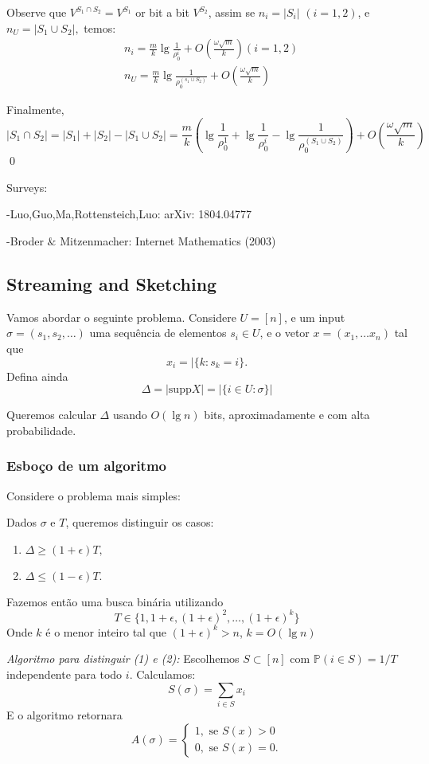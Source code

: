 Observe que $V^{S_1\cap S_2} = V^{S_1} $ or bit a bit $V^{S_2}$, assim se $n_i=|S_i|$  $(i=1,2)$, e $n_U = |S_1\cup S_2|,$ temos:
\begin{align*}
&n_i = \frac{m}{k} \lg \frac{1}{\rho_0^i} + O\left(\frac{\omega \sqrt m}{k}\right) 	(i=1,2)\\
&n_U = \frac{m}{k} \lg \frac{1}{\rho_0^{(s_1 \cup S_2)}} + O\left(\frac{\omega \sqrt m}{k}\right)
\end{align*}

Finalmente,
\[|S_1 \cap S_2| = |S_1| + |S_2| - |S_1\cup S_2| = \frac{m}{k}\left( \lg \frac{1}{\rho_0^1} + \lg \frac{1}{\rho_0^i} - \lg \frac{1}{\rho_0^{(S_1\cup S_2)}} \right)+ O\left(\frac{\omega \sqrt m}{k}\right) \]
\qed

Surveys:

-Luo,Guo,Ma,Rottensteich,Luo: arXiv: 1804.04777

-Broder $\&$ Mitzenmacher: Internet Mathematics (2003)

\subsection{Streaming and Sketching} Vamos abordar o seguinte problema. Considere $U=[n]$, e um input $\sigma = (s_1,s_2,\dots)$ uma sequ\^encia de elementos $s_i \in U$, e o vetor $x=(x_1,\dots x_n)$ tal que
\[x_i=|\{k:s_k=i\}.\]
Defina ainda 
\[\Delta = |\text{supp} X| = |\{i \in U: \sigma \}|\] 

Queremos calcular $\Delta$ usando $O(\lg n)$ bits, aproximadamente e com alta probabilidade.

\subsubsection{Esbo\c{c}o de um algoritmo}
Considere o problema mais simples:

Dados $\sigma$ e $T$, queremos distinguir os casos:

\begin{enumerate}
\item $\Delta \ge (1+\epsilon)T,$
\item $\Delta \le (1-\epsilon)T.$
\end{enumerate}

Fazemos ent\~ao uma busca bin\'aria utilizando 
\[T \in \{1, 1+\epsilon, (1+\epsilon)^2, \dots, (1+\epsilon)^k\}\]
Onde $k$ \'e o menor inteiro tal que $(1+\epsilon)^k>n$, $k=O(\lg n)$

\textit{Algoritmo para distinguir (1) e (2):} Escolhemos $S\subset [n]$ com $\mathbb{P}(i \in S) = 1/T$ independente para todo $i$. Calculamos:
\[S(\sigma) = \sum_{i \in S} x_i\]
E o algoritmo retornara 
\[A(\sigma) = \begin{cases}
1, \text{ se } S(x)>0\\
0, \text{ se } S(x)=0.
\end{cases}\]

